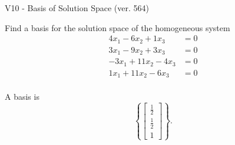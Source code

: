\begin{exercise}
  \begin{exerciseTitle}V10 - Basis of Solution Space (ver. 564)\end{exerciseTitle}
  \begin{exerciseStatement}
    Find a basis for the solution space of the homogeneous system 
\begin{align*}
 4 x_ 1 -6 x_ 2 + 1 x_ 3 &= 0  \\ 
  3 x_ 1 -9 x_ 2 + 3 x_ 3 &= 0  \\ 
  -3 x_ 1 + 11 x_ 2 -4 x_ 3 &= 0  \\ 
  1 x_ 1 + 11 x_ 2 -6 x_ 3 &= 0  \\ 
 \end{align*}


 
  \end{exerciseStatement}

  \begin{exerciseAnswer}
   A basis is   
\[\left\{\left[\begin{array}{c}
\frac{1}{2} \\
\frac{1}{2} \\
1
\end{array}\right]\right\}.\]

  


  \end{exerciseAnswer}
\end{exercise}